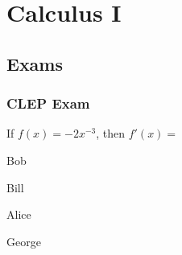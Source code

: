 \documentclass[crop=false,class=book]{standalone}
\begin{document}
\chapter{Calculus I}
\section{Exams}
\subsection{CLEP Exam}
\begin{problem}
    If $f(x)=-2x^{-3}$, then $f'(x)=$
    \begin{enumerate}[label=(\Alph*)]
        \begin{multicols}{4}
            \item Bob
            \item Bill
            \item Alice
            \item George
        \end{multicols}
    \end{enumerate}
\end{problem}
\clearpage
\end{document}

